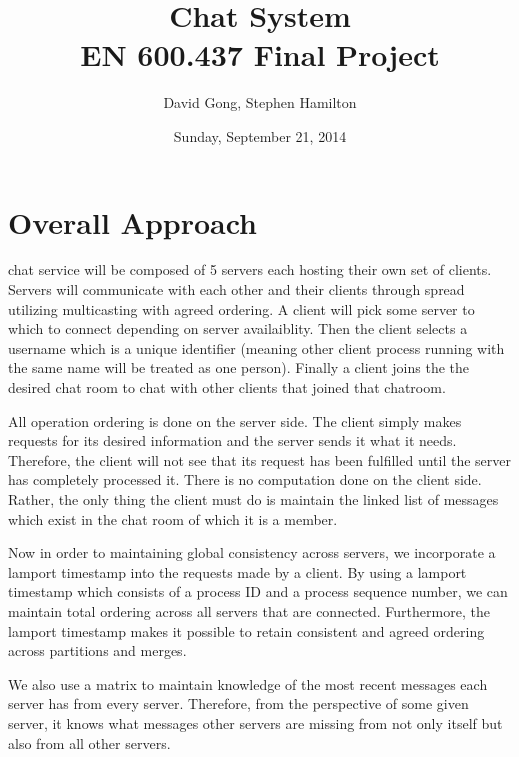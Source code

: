 \documentclass[12pt,journal,compsoc]{IEEEtran}
\begin{document}
\title{Chat System\\EN 600.437 Final Project}
\author{David Gong, Stephen Hamilton}%
\date{Sunday, September 21, 2014}
\maketitle
\section{Overall Approach}
 chat service will be composed of 5 servers each hosting their own set of clients. Servers will communicate with each other and their clients through spread utilizing multicasting with agreed ordering. A client will pick some server to which to connect depending on server availaiblity. Then the client selects a username which is a unique identifier (meaning other client process running with the same name will be treated as one person). Finally a client joins the the desired chat room to chat with other clients that joined that chatroom.

All operation ordering is done on the server side. The client simply makes requests for its desired information and the server sends it what it needs. Therefore, the client will not see that its request has been fulfilled until the server has completely processed it. There is no computation done on the client side. Rather, the only thing the client must do is maintain the linked list of messages which exist in the chat room of which it is a member.

Now in order to maintaining global consistency across servers, we incorporate a lamport timestamp into the requests made by a client. By using a lamport timestamp which consists of a process ID and a process sequence number, we can maintain total ordering across all servers that are connected. Furthermore, the lamport timestamp makes it possible to retain consistent and agreed ordering across partitions and merges.

We also use a matrix to maintain knowledge of the most recent messages each server has from every server. Therefore, from the perspective of some given server, it knows what messages other servers are missing from not only itself but also from all other servers.
\end{document}
